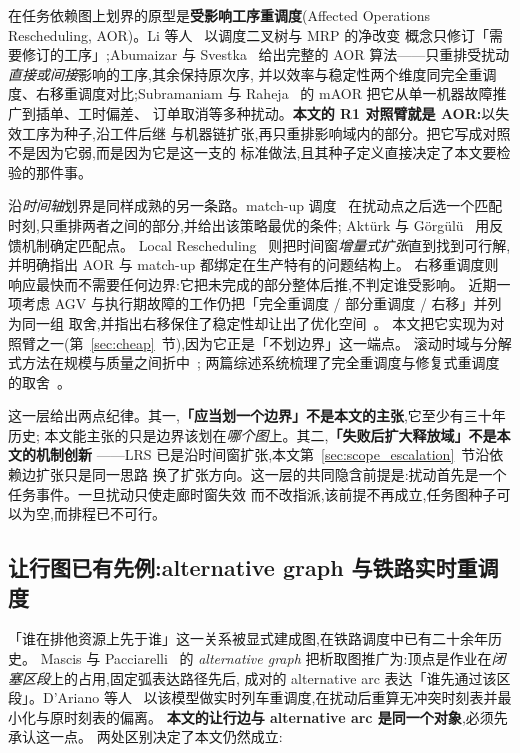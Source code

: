 \documentclass[manuscript,screen,review]{acmart}
\begin{document}
在任务依赖图上划界的原型是\textbf{受影响工序重调度}(Affected Operations
Rescheduling, AOR)。Li 等人~\cite{li1993heuristic} 以调度二叉树与 MRP 的净改变
概念只修订「需要修订的工序」;Abumaizar 与 Svestka~\cite{abumaizar1997rescheduling}
给出完整的 AOR 算法——只重排受扰动\emph{直接或间接}影响的工序,其余保持原次序,
并以效率与稳定性两个维度同完全重调度、右移重调度对比;Subramaniam 与
Raheja~\cite{subramaniam2003maor} 的 mAOR 把它从单一机器故障推广到插单、工时偏差、
订单取消等多种扰动。\textbf{本文的 R1 对照臂就是 AOR:}以失效工序为种子,沿工件后继
与机器链扩张,再只重排影响域内的部分。把它写成对照不是因为它弱,而是因为它是这一支的
标准做法,且其种子定义直接决定了本文要检验的那件事。

沿\emph{时间轴}划界是同样成熟的另一条路。match-up 调度~\cite{bean1991matchup}
在扰动点之后选一个匹配时刻,只重排两者之间的部分,并给出该策略最优的条件;
Aktürk 与 Görgülü~\cite{akturk1999matchup} 用反馈机制确定匹配点。
Local Rescheduling~\cite{kuster2007local} 则把时间窗\emph{增量式扩张}直到找到可行解,
并明确指出 AOR 与 match-up 都绑定在生产特有的问题结构上。
右移重调度则响应最快而不需要任何边界:它把未完成的部分整体后推,不判定谁受影响。
近期一项考虑 AGV 与执行期故障的工作仍把「完全重调度 / 部分重调度 / 右移」并列为同一组
取舍,并指出右移保住了稳定性却让出了优化空间~\cite{tang2026dynamic}。
本文把它实现为对照臂之一(第~\ref{sec:cheap}~节),因为它正是「不划边界」这一端点。
滚动时域与分解式方法在规模与质量之间折中~\cite{zeitrag2025novel,zhao2019decomposition};
两篇综述系统梳理了完全重调度与修复式重调度的取舍~\cite{vieira2003rescheduling,ouelhadj2009survey}。

这一层给出两点纪律。其一,\textbf{「应当划一个边界」不是本文的主张},它至少有三十年历史;
本文能主张的只是边界该划在\emph{哪个图}上。其二,\textbf{「失败后扩大释放域」不是本文的机制创新}
——LRS 已是沿时间窗扩张,本文第~\ref{sec:scope_escalation}~节沿依赖边扩张只是同一思路
换了扩张方向。这一层的共同隐含前提是:扰动首先是一个任务事件。一旦扰动只使走廊时窗失效
而不改指派,该前提不再成立,任务图种子可以为空,而排程已不可行。

\subsection{让行图已有先例:alternative graph 与铁路实时重调度}
\label{sec:rw_ag}

「谁在排他资源上先于谁」这一关系被显式建成图,在铁路调度中已有二十余年历史。
Mascis 与 Pacciarelli~\cite{mascis2002alternative} 的 \emph{alternative graph}
把析取图推广为:顶点是作业在\emph{闭塞区段}上的占用,固定弧表达路径先后,
成对的 alternative arc 表达「谁先通过该区段」。D'Ariano 等人~\cite{dariano2007branch}
以该模型做实时列车重调度,在扰动后重算无冲突时刻表并最小化与原时刻表的偏离。
\textbf{本文的让行边与 alternative arc 是同一个对象},必须先承认这一点。
两处区别决定了本文仍然成立:
\end{document}
